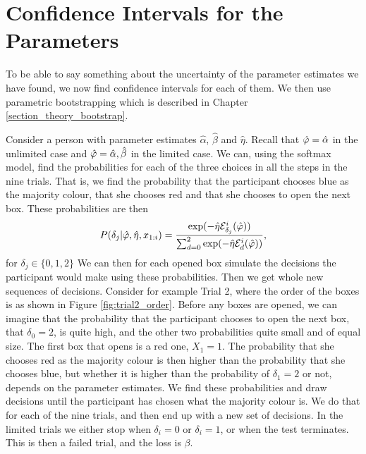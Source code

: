 \section{Confidence Intervals for the Parameters}
To be able to say something about the uncertainty of the parameter estimates we have found, we now find confidence intervals for each of them. We then use parametric bootstrapping which is described in Chapter \ref{section_theory_bootstrap}.

Consider a person with parameter estimates $\hat{\alpha}$, $\hat{\beta}$ and $\hat{\eta}$. Recall that $\hat{\varphi}=\hat{\alpha}$ in the unlimited case and $\hat{\varphi}=\hat{\alpha},\hat{\beta}$ in the limited case. 
We can, using the softmax model, find the probabilities for each of the three choices in all the steps in the nine trials. That is, we find the probability that the participant chooses blue as the majority colour, that she chooses red and that she chooses to open the next box. These probabilities are then
\begin{equation}
\label{probabilities_bootstrap}
    P(\delta_{j}|\hat{\varphi},\hat{\eta},x_{1:i}) = \frac{\text{exp}(- \hat{\eta} \mathcal{E}^i_{\delta_j}(\hat{\varphi}))}{\sum_{d=0}^{2} \text{exp}(-\hat{\eta} \mathcal{E}^i_{d}(\hat{\varphi}))},
\end{equation}
for $\delta_j \in \{0,1,2 \}$
We can then for each opened box simulate the decisions the participant would make using these probabilities. Then we get whole new sequences of decisions. Consider for example Trial 2, where the order of the boxes is as shown in Figure \ref{fig:trial2_order}. Before any boxes are opened, we can imagine that the probability that the participant chooses to open the next box, that $\delta_0=2$, is quite high, and the other two probabilities quite small and of equal size. The first box that opens is a red one, $X_1=1$. The probability that she chooses red as the majority colour is then higher than the probability that she chooses blue, but whether it is higher than the probability of $\delta_1=2$ or not, depends on the parameter estimates. We find these probabilities and draw decisions until the participant has chosen what the majority colour is. We do that for each of the nine trials, and then end up with a new set of decisions. In the limited trials we either stop when $\delta_i=0$ or $\delta_i=1$, or when the test terminates. This is then a failed trial, and the loss is $\beta$. 


